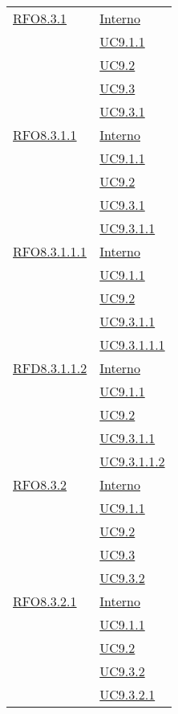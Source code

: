 \begin{longtable}{|>{\centering}m{5cm}|m{5cm}<{\centering}|}
\hyperlink{RFO8.3.1}{RFO8.3.1} & \hyperlink{Interno}{Interno}\\
& \hyperref[UC9.1.1]{UC9.1.1}\\
& \hyperref[UC9.2]{UC9.2}\\
& \hyperref[UC9.3]{UC9.3}\\
& \hyperref[UC9.3.1]{UC9.3.1}\\ \hline

\hyperlink{RFO8.3.1.1}{RFO8.3.1.1} & \hyperlink{Interno}{Interno}\\
& \hyperref[UC9.1.1]{UC9.1.1}\\
& \hyperref[UC9.2]{UC9.2}\\
& \hyperref[UC9.3.1]{UC9.3.1}\\
& \hyperref[UC9.3.1.1]{UC9.3.1.1}\\ \hline

\hyperlink{RFO8.3.1.1.1}{RFO8.3.1.1.1} & \hyperlink{Interno}{Interno}\\
& \hyperref[UC9.1.1]{UC9.1.1}\\
& \hyperref[UC9.2]{UC9.2}\\
& \hyperref[UC9.3.1.1]{UC9.3.1.1}\\
& \hyperref[UC9.3.1.1.1]{UC9.3.1.1.1}\\ \hline

\hyperlink{RFD8.3.1.1.2}{RFD8.3.1.1.2} & \hyperlink{Interno}{Interno}\\
& \hyperref[UC9.1.1]{UC9.1.1}\\
& \hyperref[UC9.2]{UC9.2}\\
& \hyperref[UC9.3.1.1]{UC9.3.1.1}\\
& \hyperref[UC9.3.1.1.2]{UC9.3.1.1.2}\\ \hline

\hyperlink{RFO8.3.2}{RFO8.3.2} & \hyperlink{Interno}{Interno}\\
& \hyperref[UC9.1.1]{UC9.1.1}\\
& \hyperref[UC9.2]{UC9.2}\\
& \hyperref[UC9.3]{UC9.3}\\
& \hyperref[UC9.3.2]{UC9.3.2}\\ \hline

\hyperlink{RFO8.3.2.1}{RFO8.3.2.1} & \hyperlink{Interno}{Interno}\\
& \hyperref[UC9.1.1]{UC9.1.1}\\
& \hyperref[UC9.2]{UC9.2}\\
& \hyperref[UC9.3.2]{UC9.3.2}\\
& \hyperref[UC9.3.2.1]{UC9.3.2.1}\\ \hline


\end{longtable}
